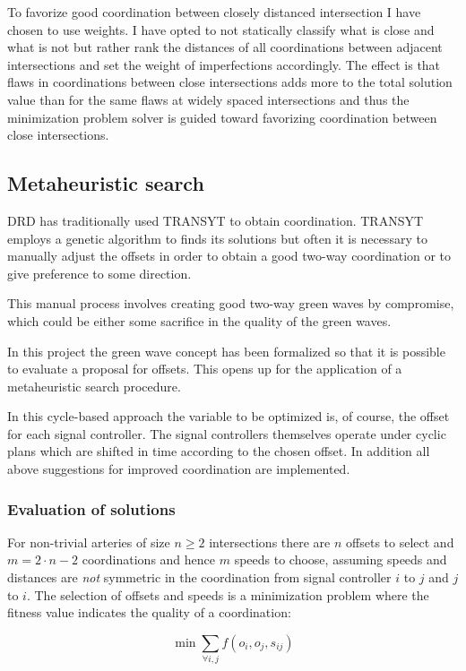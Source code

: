 To favorize good coordination between closely distanced intersection I have chosen to use weights.  I have opted to not statically classify what is close and what is not but rather rank the distances of all coordinations between adjacent intersections and set the weight of imperfections accordingly. The effect is that flaws in coordinations between close intersections adds more to the total solution value than for the same flaws at widely spaced intersections and thus the minimization problem solver is guided toward favorizing coordination between close intersections.

\subsection{Metaheuristic search}
DRD has traditionally used TRANSYT to obtain coordination. TRANSYT employs a genetic algorithm to finds its solutions but often it is necessary to manually adjust the offsets in order to obtain a good two-way coordination or to give preference to some direction. 

This manual process involves creating good two-way green waves by compromise, which could be either some sacrifice in the quality of the green waves. 

In this project the green wave concept has been formalized so that it is possible to evaluate a proposal for offsets. This opens up for the application of a metaheuristic search procedure.

In this cycle-based approach the variable to be optimized is, of course, the offset for each signal controller. The signal controllers themselves operate under cyclic plans which are shifted in time according to the chosen offset. In addition all above suggestions for improved coordination are implemented.

\subsubsection*{Evaluation of solutions}
\label{eval_coord}
For non-trivial arteries of size $n \geq 2$ intersections there are $n$ offsets to select and $m = 2 \cdot n - 2$ coordinations and hence $m$ speeds to choose, assuming speeds and distances are \textit{not} symmetric in the coordination from signal controller $i$ to $j$ and $j$ to $i$.
The selection of offsets and speeds is a minimization problem where the fitness value indicates the quality of a coordination:

$$ \min \sum_{\forall i,j} f(o_i,o_j,s_{ij})$$

